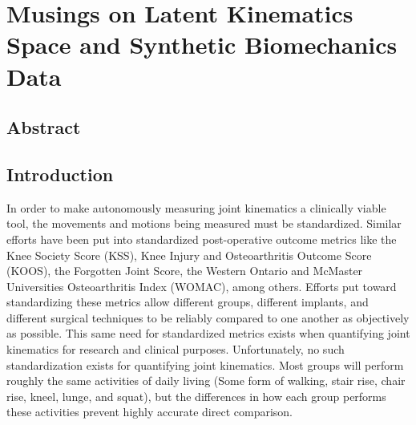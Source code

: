 \chapter{Musings on Latent Kinematics Space and Synthetic Biomechanics Data}

\section{Abstract}
\section{Introduction}
In order to make autonomously measuring joint kinematics a clinically viable tool, the movements and motions being measured must be standardized.
Similar efforts have been put into standardized post-operative outcome metrics like the Knee Society Score (KSS), Knee Injury and Osteoarthritis Outcome Score (KOOS), the Forgotten Joint Score, the Western Ontario and McMaster Universities Osteoarthritis Index (WOMAC), among others.
Efforts put toward standardizing these metrics allow different groups, different implants, and different surgical techniques to be reliably compared to one another as objectively as possible.
This same need for standardized metrics exists when quantifying joint kinematics for research and clinical purposes.
Unfortunately, no such standardization exists for quantifying joint kinematics.
Most groups will perform roughly the same activities of daily living (Some form of walking, stair rise, chair rise, kneel, lunge, and squat), but the differences in how each group performs these activities prevent highly accurate direct comparison.

